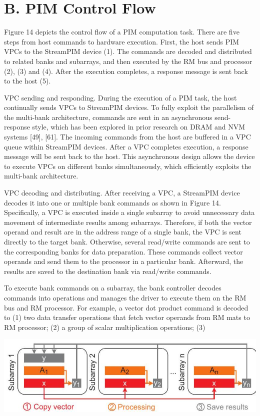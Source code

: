 \documentclass[10pt]{article}
\begin{document}
\section*{B. PIM Control Flow}
Figure 14 depicts the control flow of a PIM computation task. There are five steps from host commands to hardware execution. First, the host sends PIM VPCs to the StreamPIM device (1). The commands are decoded and distributed to related banks and subarrays, and then executed by the RM bus and processor (2), (3) and (4). After the execution completes, a response message is sent back to the host (5).

VPC sending and responding. During the execution of a PIM task, the host continually sends VPCs to StreamPIM devices. To fully exploit the parallelism of the multi-bank architecture, commands are sent in an asynchronous send-response style, which has been explored in prior research on DRAM and NVM systems [49], [61]. The incoming commands from the host are buffered in a VPC queue within StreamPIM devices. After a VPC completes execution, a response message will be sent back to the host. This asynchronous design allows the device to execute VPCs on different banks simultaneously, which efficiently exploits the multi-bank architecture.

VPC decoding and distributing. After receiving a VPC, a StreamPIM device decodes it into one or multiple bank commands as shown in Figure 14. Specifically, a VPC is executed inside a single subarray to avoid unnecessary data movement of intermediate results among subarrays. Therefore, if both the vector operand and result are in the address range of a single bank, the VPC is sent directly to the target bank. Otherwise, several read/write commands are sent to the corresponding banks for data preparation. These commands collect vector operands and send them to the processor in a particular bank. Afterward, the results are saved to the destination bank via read/write commands.

To execute bank commands on a subarray, the bank controller decodes commands into operations and manages the driver to execute them on the RM bus and RM processor. For example, a vector dot product command is decoded to (1) two data transfer operations that fetch vector operands from RM mats to RM processor; (2) a group of scalar multiplication operations; (3)

\begin{center}
\includegraphics[max width=\textwidth]{2024_05_12_abeba8a85da5b5ec4c7bg-08}
\end{center}
\end{document}
